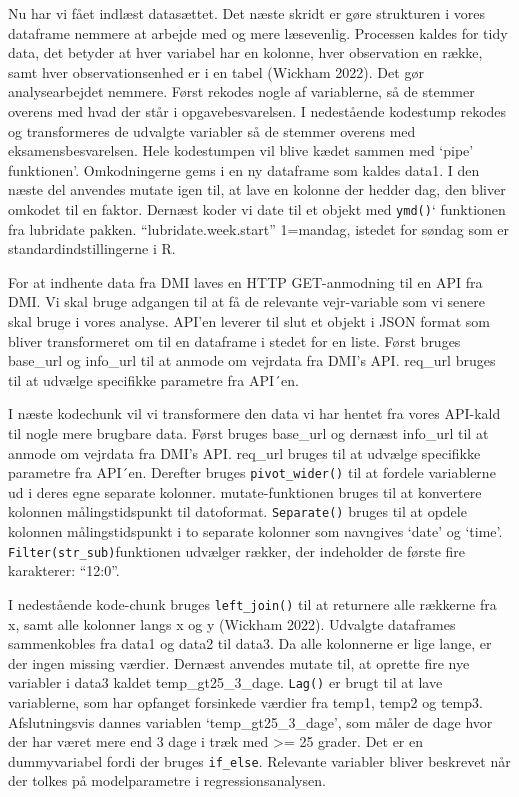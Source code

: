 \documentclass[
  12pt,
  a4paper,
  DIV=11,
  numbers=noendperiod]{scrartcl}
\begin{document}
Nu har vi fået indlæst datasættet. Det næste skridt er gøre strukturen i
vores dataframe nemmere at arbejde med og mere læsevenlig. Processen
kaldes for tidy data, det betyder at hver variabel har en kolonne, hver
observation en række, samt hver observationsenhed er i en tabel (Wickham
2022). Det gør analysearbejdet nemmere. Først rekodes nogle af
variablerne, så de stemmer overens med hvad der står i
opgavebesvarelsen. I nedestående kodestump rekodes og transformeres de
udvalgte variabler så de stemmer overens med eksamensbesvarelsen. Hele
kodestumpen vil blive kædet sammen med `pipe' funktionen'. Omkodningerne
gems i en ny dataframe som kaldes data1. I den næste del anvendes mutate
igen til, at lave en kolonne der hedder dag, den bliver omkodet til en
faktor. Dernæst koder vi date til et objekt med \texttt{ymd()}`
funktionen fra lubridate pakken. ``lubridate.week.start'' 1=mandag,
istedet for søndag som er standardindstillingerne i R.

For at indhente data fra DMI laves en HTTP GET-anmodning til en API fra
DMI. Vi skal bruge adgangen til at få de relevante vejr-variable som vi
senere skal bruge i vores analyse. API'en leverer til slut et objekt i
JSON format som bliver transformeret om til en dataframe i stedet for en
liste. Først bruges base\_url og info\_url til at anmode om vejrdata fra
DMI's API. req\_url bruges til at udvælge specifikke parametre fra
API´en.

I næste kodechunk vil vi transformere den data vi har hentet fra vores
API-kald til nogle mere brugbare data. Først bruges base\_url og dernæst
info\_url til at anmode om vejrdata fra DMI's API. req\_url bruges til
at udvælge specifikke parametre fra API´en. Derefter bruges
\texttt{pivot\_wider()} til at fordele variablerne ud i deres egne
separate kolonner. mutate-funktionen bruges til at konvertere kolonnen
målingstidspunkt til datoformat. \texttt{Separate()} bruges til at
opdele kolonnen målingstidspunkt i to separate kolonner som navngives
`date' og `time'. \texttt{Filter(str\_sub)}funktionen udvælger rækker,
der indeholder de første fire karakterer: ``12:0''.

I nedestående kode-chunk bruges \texttt{left\_join()} til at returnere
alle rækkerne fra x, samt alle kolonner langs x og y (Wickham 2022).
Udvalgte dataframes sammenkobles fra data1 og data2 til data3. Da alle
kolonnerne er lige lange, er der ingen missing værdier. Dernæst anvendes
mutate til, at oprette fire nye variabler i data3 kaldet
temp\_gt25\_3\_dage. \texttt{Lag()} er brugt til at lave variablerne,
som har opfanget forsinkede værdier fra temp1, temp2 og temp3.
Afslutningsvis dannes variablen `temp\_gt25\_3\_dage', som måler de dage
hvor der har været mere end 3 dage i træk med \textgreater= 25 grader.
Det er en dummyvariabel fordi der bruges \texttt{if\_else}. Relevante
variabler bliver beskrevet når der tolkes på modelparametre i
regressionsanalysen.
\end{document}
